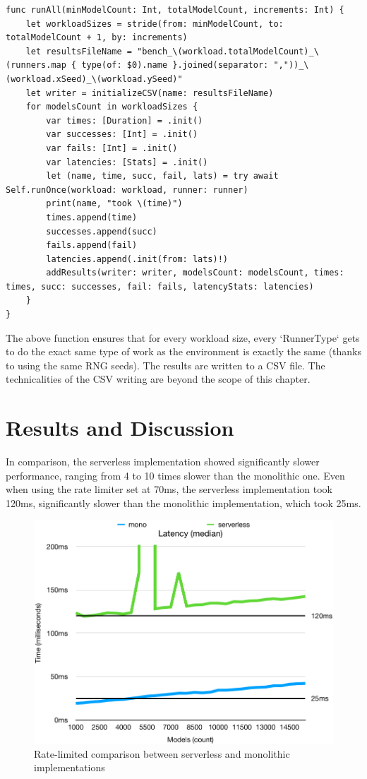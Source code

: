 \begin{verbatim}
func runAll(minModelCount: Int, totalModelCount, increments: Int) {
    let workloadSizes = stride(from: minModelCount, to: totalModelCount + 1, by: increments)
    let resultsFileName = "bench_\(workload.totalModelCount)_\(runners.map { type(of: $0).name }.joined(separator: ","))_\(workload.xSeed)_\(workload.ySeed)"
    let writer = initializeCSV(name: resultsFileName)
    for modelsCount in workloadSizes {
        var times: [Duration] = .init()
        var successes: [Int] = .init()
        var fails: [Int] = .init()
        var latencies: [Stats] = .init()
        let (name, time, succ, fail, lats) = try await Self.runOnce(workload: workload, runner: runner)
        print(name, "took \(time)")
        times.append(time)
        successes.append(succ)
        fails.append(fail)
        latencies.append(.init(from: lats)!)
        addResults(writer: writer, modelsCount: modelsCount, times: times, succ: successes, fail: fails, latencyStats: latencies)
    }
}
\end{verbatim}

The above function ensures that for every workload size, every `RunnerType` gets to do the exact same type of work as the environment is exactly the same (thanks to using the same RNG seeds). The results are written to a CSV file. The technicalities of the CSV writing are beyond the scope of this chapter.


\section{Results and Discussion}

In comparison, the serverless implementation showed significantly slower performance, ranging from 4 to 10 times slower than the monolithic one. Even when using the rate limiter set at 70ms, the serverless implementation took 120ms, significantly slower than the monolithic implementation, which took 25ms.

\begin{figure}[h!]
    \centering
    \includegraphics[width=\textwidth]{media/rate_l70ms_latency_med.pdf}
    \caption{Rate-limited comparison between serverless and monolithic implementations}
    \label{fig:rate_limited_comparison}
\end{figure}

